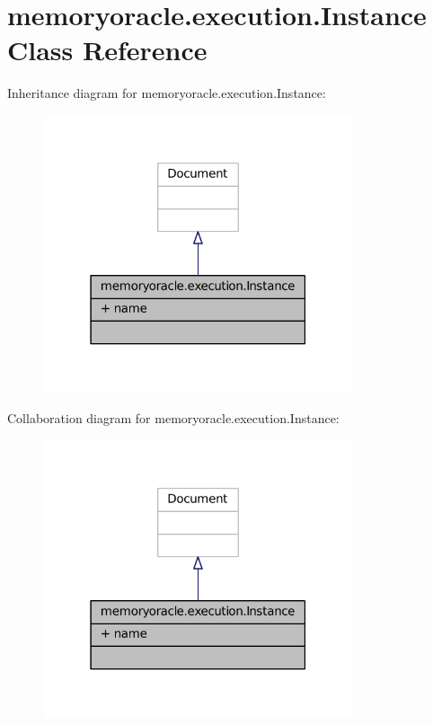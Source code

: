 \hypertarget{classmemoryoracle_1_1execution_1_1Instance}{}\section{memoryoracle.\+execution.\+Instance Class Reference}
\label{classmemoryoracle_1_1execution_1_1Instance}


Inheritance diagram for memoryoracle.\+execution.\+Instance\+:
\nopagebreak
\begin{figure}[H]
\begin{center}
\leavevmode
\includegraphics[width=259pt]{classmemoryoracle_1_1execution_1_1Instance__inherit__graph}
\end{center}
\end{figure}


Collaboration diagram for memoryoracle.\+execution.\+Instance\+:
\nopagebreak
\begin{figure}[H]
\begin{center}
\leavevmode
\includegraphics[width=259pt]{classmemoryoracle_1_1execution_1_1Instance__coll__graph}
\end{center}
\end{figure}
